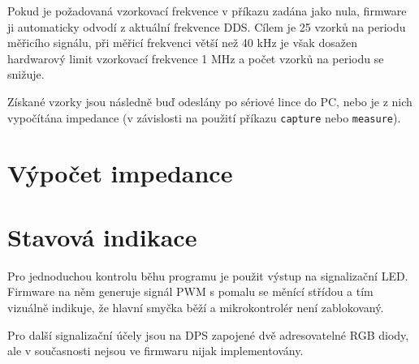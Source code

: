 Pokud je požadovaná vzorkovací frekvence v příkazu zadána jako nula, 
firmware ji automaticky odvodí z aktuální frekvence DDS. 
Cílem je 25 vzorků na periodu měřicího signálu, při měřicí frekvenci větší než 40 kHz 
je však dosažen hardwarový limit vzorkovací frekvence 1 MHz a počet vzorků na periodu se snižuje.

Získané vzorky jsou následně buď odeslány po sériové lince do PC, nebo je z nich vypočítána impedance 
(v závislosti na použití příkazu \texttt{capture} nebo \texttt{measure}).


\section{Výpočet impedance}


\section{Stavová indikace}

Pro jednoduchou kontrolu běhu programu je použit výstup na signalizační LED. 
Firmware na něm generuje signál PWM s pomalu se měnící střídou a tím vizuálně indikuje, 
že hlavní smyčka běží a mikrokontrolér není zablokovaný.

Pro další signalizační účely jsou na DPS zapojené dvě adresovatelné RGB diody, 
ale v současnosti nejsou ve firmwaru nijak implementovány.


